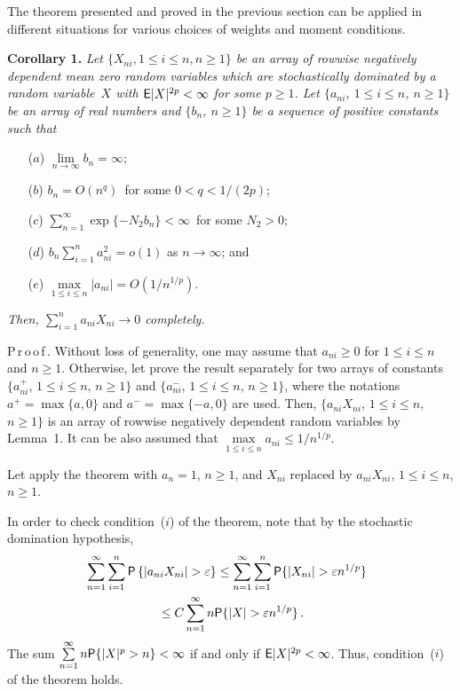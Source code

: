 \begin{multicols}{2}
\noindent
The theorem presented and proved in the previous section can be applied in different situations for various choices
of weights and moment conditions.

\smallskip

\noindent 
\textbf{Corollary 1.} \textit{Let $\{X_{ni}, 1\le i \le n, n\ge 1\}$ be an array of rowwise negatively
dependent mean zero random variables which are stochastically dominated by a random variable~$X$ with
${\sf E}|X|^{2p}<\infty$ for some $p\ge 1$. Let $\{a_{ni}$, $1\le i\le n$, $n\ge 1\}$ be an array of real numbers and
$\{b_n$, $n\ge 1\}$ be a sequence of positive constants such that}
\begin{itemize}
\item[($a$)] $\lim\limits_{n\to\infty} b_n=\infty$;
\item[($b$)] $b_n= O(n^q)$\ for some $0<q <1/(2p)$;
\item[($c$)] $\sum\limits_{n=1}^\infty \exp\{-N_2 b_n\}<\infty$\ for some $N_2>0;$
\item[($d$)] $b_n \sum\limits_{i=1}^n a_{ni}^2=o(1)$ as $n\to\infty$; and 
\item[($e$)] $\max\limits_{1\le i\le n} |a_{ni}|=O(1/n^{1/p})$.
\end{itemize}
\textit{Then, $ \sum\limits_{i=1}^n a_{ni}X_{ni} \to 0$ completely.}

\medskip

\noindent 
P\,r\,o\,o\,f\,. 
Without loss of generality, one may assume that $a_{ni}\ge 0$  for $1\le i\le n$ and $n\ge
1$. Otherwise, let prove the result separately for two arrays of constants $\{a^+_{ni}$, $1\le i\le n$, 
$n\ge 1\}$ and
$\{a^-_{ni}$, $1\le i\le n$, $n\ge 1\}$, where  the notations $a^+=\max\{a, 0\}$ and $a^-=\max\{-a, 0\}$
are used. Then,
$\{a_{ni} X_{ni}$, $1\le i\le n$, $n\ge 1\}$ is an array of rowwise negatively 
dependent random variables by 
Lemma~1. It can  be also assumed that $\max\limits_{1\le i\le n} a_{ni}\le 1/n^{1/p}$.

Let apply the theorem with $a_n=1$, $n\ge 1$, and $X_{ni}$ replaced by $a_{ni}X_{ni}$, 
$1\le i\le n$, $n\ge 1$.

In order to check condition~($i$) of the theorem, note that by the stochastic domination hypothesis,
\begin{multline*}
\hspace*{-6.44308pt}\sum\limits_{n=1}^\infty  \sum\limits_{i=1}^n {\sf P}
\left\{\left\vert a_{ni}X_{ni}\right\vert>\varepsilon\right\}\le\sum\limits_{n=1}^\infty
\sum\limits_{i=1}^n
{\sf P}\{|X_{ni}|>\varepsilon n^{1/p}\} \\
{}\le C \sum\limits_{n=1}^\infty  n {\sf P}\{|X|>\varepsilon n^{1/p}\}\,.
\end{multline*}
The sum $\sum\limits_{n=1}^\infty  n {\sf P}\{|X|^p>n\}<\infty$ if and only if 
${\sf E}|X|^{2p}<\infty$.
Thus, condition~($i$) of the theorem holds.


\end{multicols}
